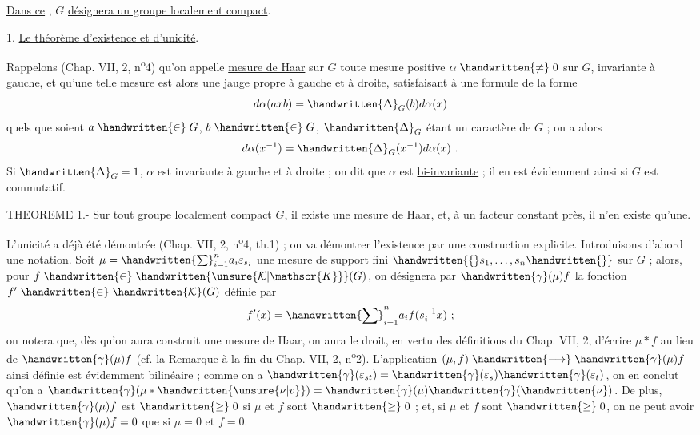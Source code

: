\uline{Dans ce} \handwritten{\S}, $G$ \uline{désignera un groupe localement compact}.

1. \uline{Le théorème d'existence et d'unicité}.

Rappelons (Chap. VII, \handwritten{\S} 2, n\textsuperscript{o}4) qu'on appelle \uline{mesure de Haar} sur $G$ toute mesure positive $\alpha\mathrel{\handwritten{\ne}}0$ sur $G$, invariante à gauche, et qu'une telle mesure est alors une jauge propre à gauche et à droite, satisfaisant à une formule de la forme
\[
d\alpha(axb)=\handwritten{\Delta}_G(b)d\alpha(x)
\]
quels que soient $a\mathrel{\handwritten{\in}}G$, $b\mathrel{\handwritten{\in}}G$, $\handwritten{\Delta}_G$ étant un caractère de $G$ ; on a alors
\[
d\alpha(x^{-1})=\handwritten{\Delta}_G(x^{-1})d\alpha(x)\ .
\]
Si $\handwritten{\Delta}_G=1$, $\alpha$ est invariante à gauche et à droite ; on dit que $\alpha$ est \uline{bi-invariante} ; il en est évidemment ainsi si $G$ est commutatif.

THEOREME 1.- \uline{Sur tout groupe localement compact} $G$, \uline{il existe une mesure de Haar}, \uline{et}, \uline{à un facteur constant près}, \uline{il n'en existe qu'une}.

L'unicité a déjà été démontrée (Chap. VII, \handwritten{\S} 2, n\textsuperscript{o}4, th.1) ; on va démontrer l'existence par une construction explicite. Introduisons d'abord une notation. Soit $\mu=\handwritten{\sum}_{i=1}^{n}a_i\varepsilon_{s_i}$ une mesure de support fini $\handwritten{\{}s_1,\ldots,s_n\handwritten{\}}$ sur $G$ ; alors, pour $f\mathrel{\handwritten{\in}}\handwritten{\unsure{\mathcal{K}|\mathscr{K}}}(G)$, on désignera par $\handwritten{\gamma}(\mu)f$ la fonction $f'\mathrel{\handwritten{\in}}\handwritten{\mathcal{K}}(G)$ définie par
\[
f'(x)=\handwritten{\sum}_{i=1}^{n}a_i f(s_i^{-1}x)\ ;
\]
on notera que, dès qu'on aura construit une mesure de Haar, on aura le droit, en vertu des définitions du Chap. VII, \handwritten{\S} 2, d'écrire $\mu\ast f$ au lieu de $\handwritten{\gamma}(\mu)f$ (cf. la Remarque à la fin du Chap. VII, \handwritten{\S} 2, n\textsuperscript{o}2). L'application $(\mu,f)\mathrel{\handwritten{\longrightarrow}}\handwritten{\gamma}(\mu)f$ ainsi définie est évidemment bilinéaire ; comme on a $\handwritten{\gamma}(\varepsilon_{st})=\handwritten{\gamma}(\varepsilon_s)\handwritten{\gamma}(\varepsilon_t)$, on en conclut qu'on a $\handwritten{\gamma}(\mu\ast\handwritten{\unsure{\nu|v}})=\handwritten{\gamma}(\mu)\handwritten{\gamma}(\handwritten{\nu})$. De plus, $\handwritten{\gamma}(\mu)f$ est $\mathrel{\handwritten{\geq}}0$ si $\mu$ et $f$ sont $\mathrel{\handwritten{\geq}}0$ ; et, si $\mu$ et $f$ sont $\mathrel{\handwritten{\geq}}0$, on ne peut avoir $\handwritten{\gamma}(\mu)f=0$ que si $\mu=0$ et $f=0$.

